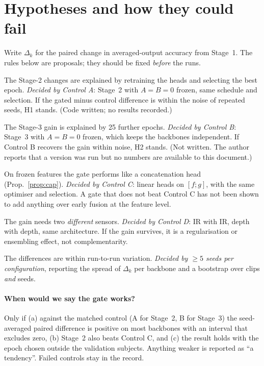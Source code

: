\documentclass[11pt,a4paper]{article}
\theoremstyle{plain}
\theoremstyle{remark}
\begin{document}
\section{Hypotheses and how they could fail}

Write $\Delta_k$ for the paired change in averaged-output accuracy from Stage~1. The rules below are proposals; they should be fixed \emph{before} the runs.

\begin{description}[leftmargin=1.2cm,style=nextline]
\item[H1 (head retraining, not gate).] The Stage-2 changes are explained by retraining the heads and selecting the best epoch. \emph{Decided by Control A}: Stage~2 with $A=B=0$ frozen, same schedule and selection. If the gated minus control difference is within the noise of repeated seeds, H1 stands. (Code written; no results recorded.)
\item[H2 (training length, not coupling).] The Stage-3 gain is explained by 25 further epochs. \emph{Decided by Control B}: Stage~3 with $A=B=0$ frozen, which keeps the backbones independent. If Control B recovers the gain within noise, H2 stands. (Not written. The author reports that a version was run but no numbers are available to this document.)
\item[H3 (no better than early fusion).] On frozen features the gate performs like a concatenation head (Prop.~\ref{prop:cap}). \emph{Decided by Control C}: linear heads on $[f;g]$, with the same optimiser and selection. A gate that does not beat Control C has not been shown to add anything over early fusion at the feature level.
\item[H4 (modality-specific).] The gain needs two \emph{different} sensors. \emph{Decided by Control D}: IR with IR, depth with depth, same architecture. If the gain survives, it is a regularisation or ensembling effect, not complementarity.
\item[H5 (noise).] The differences are within run-to-run variation. \emph{Decided by $\ge5$ seeds per configuration}, reporting the spread of $\Delta_k$ per backbone and a bootstrap over clips \emph{and} seeds.
\end{description}

\paragraph{When would we say the gate works?} Only if (a) against the matched control (A for Stage~2, B for Stage~3) the seed-averaged paired difference is positive on most backbones with an interval that excludes zero, (b) Stage~2 also beats Control C, and (c) the result holds with the epoch chosen outside the validation subjects. Anything weaker is reported as ``a tendency''. Failed controls stay in the record.
\end{document}
